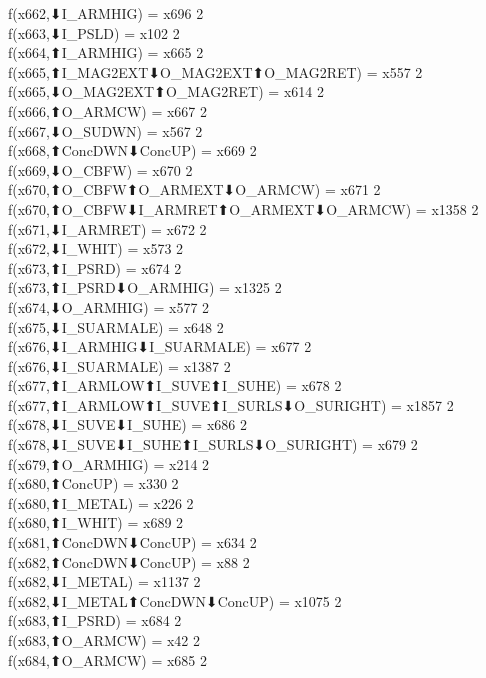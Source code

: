 f(x662,⬇I_ARMHIG) = x696 {2} \\
f(x663,⬇I_PSLD) = x102 {2} \\
f(x664,⬆I_ARMHIG) = x665 {2} \\
f(x665,⬆I_MAG2EXT⬇O_MAG2EXT⬆O_MAG2RET) = x557 {2} \\
f(x665,⬇O_MAG2EXT⬆O_MAG2RET) = x614 {2} \\
f(x666,⬆O_ARMCW) = x667 {2} \\
f(x667,⬇O_SUDWN) = x567 {2} \\
f(x668,⬆ConcDWN⬇ConcUP) = x669 {2} \\
f(x669,⬇O_CBFW) = x670 {2} \\
f(x670,⬆O_CBFW⬆O_ARMEXT⬇O_ARMCW) = x671 {2} \\
f(x670,⬆O_CBFW⬇I_ARMRET⬆O_ARMEXT⬇O_ARMCW) = x1358 {2} \\
f(x671,⬇I_ARMRET) = x672 {2} \\
f(x672,⬇I_WHIT) = x573 {2} \\
f(x673,⬆I_PSRD) = x674 {2} \\
f(x673,⬆I_PSRD⬇O_ARMHIG) = x1325 {2} \\
f(x674,⬇O_ARMHIG) = x577 {2} \\
f(x675,⬇I_SUARMALE) = x648 {2} \\
f(x676,⬇I_ARMHIG⬇I_SUARMALE) = x677 {2} \\
f(x676,⬇I_SUARMALE) = x1387 {2} \\
f(x677,⬆I_ARMLOW⬆I_SUVE⬆I_SUHE) = x678 {2} \\
f(x677,⬆I_ARMLOW⬆I_SUVE⬆I_SURLS⬇O_SURIGHT) = x1857 {2} \\
f(x678,⬇I_SUVE⬇I_SUHE) = x686 {2} \\
f(x678,⬇I_SUVE⬇I_SUHE⬆I_SURLS⬇O_SURIGHT) = x679 {2} \\
f(x679,⬆O_ARMHIG) = x214 {2} \\
f(x680,⬆ConcUP) = x330 {2} \\
f(x680,⬆I_METAL) = x226 {2} \\
f(x680,⬆I_WHIT) = x689 {2} \\
f(x681,⬆ConcDWN⬇ConcUP) = x634 {2} \\
f(x682,⬆ConcDWN⬇ConcUP) = x88 {2} \\
f(x682,⬇I_METAL) = x1137 {2} \\
f(x682,⬇I_METAL⬆ConcDWN⬇ConcUP) = x1075 {2} \\
f(x683,⬆I_PSRD) = x684 {2} \\
f(x683,⬆O_ARMCW) = x42 {2} \\
f(x684,⬆O_ARMCW) = x685 {2} \\
